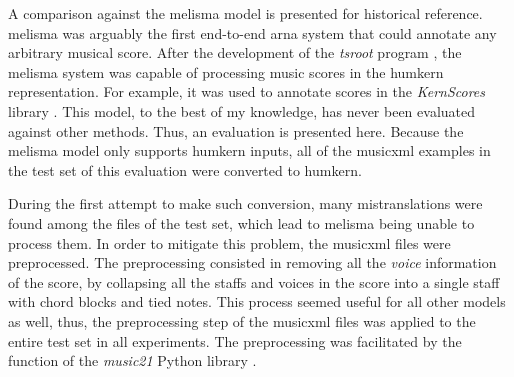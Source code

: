 
A comparison against the \gls{melisma} model is presented
for historical reference. \gls{melisma} was arguably the
first end-to-end \gls{arna} system that could annotate any
arbitrary musical score. After the development of the
\emph{tsroot} program \parencite{sapp2009tsroot}, the
\gls{melisma} system was capable of processing music scores
in the \gls{humkern} representation. For example, it was
used to annotate scores in the \emph{KernScores} library
\parencite{sapp2005online}. This model, to the best of my
knowledge, has never been evaluated against other methods.
Thus, an evaluation is presented here. Because the
\gls{melisma} model only supports \gls{humkern} inputs, all
of the \gls{musicxml} examples in the test set of this
evaluation were converted to \gls{humkern}. 

During the first attempt to make such conversion, many
mistranslations were found among the files of the test set,
which lead to \gls{melisma} being unable to process them. In
order to mitigate this problem, the \gls{musicxml} files
were preprocessed. The preprocessing consisted in removing
all the \emph{voice} information of the score, by collapsing
all the staffs and voices in the score into a single staff
with chord blocks and tied notes. This process seemed useful
for all other models as well, thus, the preprocessing step
of the \gls{musicxml} files was applied to the entire test
set in all experiments. The preprocessing was facilitated by
the  function of the \emph{music21} Python
library \parencite{cuthbert2010music21}.




    
